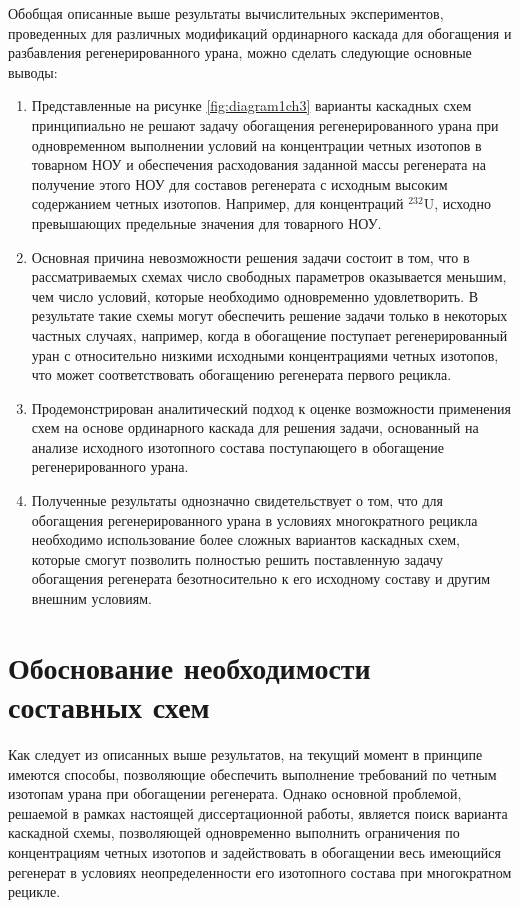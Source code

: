 Обобщая описанные выше результаты вычислительных экспериментов, проведенных для различных модификаций ординарного каскада для обогащения и разбавления регенерированного урана, можно сделать следующие основные выводы:
\begin{enumerate}
  \item Представленные на рисунке \ref{fig:diagram1ch3} варианты каскадных схем принципиально не решают задачу обогащения регенерированного урана при одновременном выполнении условий на концентрации четных изотопов в товарном НОУ и обеспечения расходования заданной массы регенерата на получение этого НОУ для составов регенерата с исходным высоким содержанием четных изотопов. Например, для концентраций $^{232}$U, исходно превышающих предельные значения для товарного НОУ. 
  \item Основная причина невозможности решения задачи состоит в том, что в рассматриваемых схемах число свободных параметров оказывается меньшим, чем число условий, которые необходимо одновременно удовлетворить. В результате такие схемы могут обеспечить решение задачи только в некоторых частных случаях, например, когда в обогащение поступает регенерированный уран с относительно низкими исходными концентрациями четных изотопов, что может соответствовать обогащению регенерата первого рецикла.
  \item Продемонстрирован аналитический подход к оценке возможности применения схем на основе ординарного каскада для решения задачи, основанный на анализе исходного изотопного состава поступающего в обогащение регенерированного урана.
  \item Полученные результаты однозначно свидетельствует о том, что для обогащения регенерированного урана в условиях многократного рецикла необходимо использование более сложных вариантов каскадных схем, которые смогут позволить полностью решить поставленную задачу обогащения регенерата безотносительно к его исходному составу и другим внешним условиям.
\end{enumerate}

\section{Обоснование необходимости составных схем}\label{sec:ch2/sec2}

Как следует из описанных выше результатов, на текущий момент в принципе имеются способы, позволяющие обеспечить выполнение требований по четным изотопам урана при обогащении регенерата. Однако основной проблемой, решаемой в рамках настоящей диссертационной работы, является поиск варианта каскадной схемы, позволяющей одновременно выполнить ограничения по концентрациям четных изотопов и задействовать в обогащении весь имеющийся регенерат в условиях неопределенности его изотопного состава при многократном рецикле.

